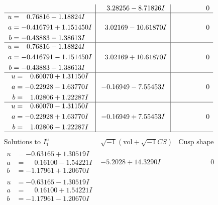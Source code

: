 \documentclass[1p]{elsarticle_modified}
\theoremstyle{definition}
\newcommand{\I}{\sqrt{-1}}
\begin{document}
$$\begin{array}{c|c|c}
 & \phantom{-}3.28256 - 8.71826 I & \phantom{-0.000000 } 0 \\ \hline\begin{aligned}
u &= \phantom{-}0.76816 + 1.18824 I \\
a &= -0.416791 + 1.151450 I \\
b &= -0.43883 - 1.38613 I\end{aligned}
 & \phantom{-}3.02169 - 10.61870 I & \phantom{-0.000000 } 0 \\ \hline\begin{aligned}
u &= \phantom{-}0.76816 - 1.18824 I \\
a &= -0.416791 - 1.151450 I \\
b &= -0.43883 + 1.38613 I\end{aligned}
 & \phantom{-}3.02169 + 10.61870 I & \phantom{-0.000000 } 0 \\ \hline\begin{aligned}
u &= \phantom{-}0.60070 + 1.31150 I \\
a &= -0.22928 - 1.63770 I \\
b &= \phantom{-}1.02806 + 1.22287 I\end{aligned}
 & -0.16949 - 7.55453 I & \phantom{-0.000000 } 0 \\ \hline\begin{aligned}
u &= \phantom{-}0.60070 - 1.31150 I \\
a &= -0.22928 + 1.63770 I \\
b &= \phantom{-}1.02806 - 1.22287 I\end{aligned}
 & -0.16949 + 7.55453 I & \phantom{-0.000000 } 0\\
 \hline 
 \end{array}$$\newpage$$\begin{array}{c|c|c}  
\text{Solutions to }I^u_{1}& \I (\text{vol} + \sqrt{-1}CS) & \text{Cusp shape}\\
 \hline 
\begin{aligned}
u &= -0.63165 + 1.30519 I \\
a &= \phantom{-}0.16100 - 1.54221 I \\
b &= -1.17961 + 1.20670 I\end{aligned}
 & -5.2028 + 14.3290 I & \phantom{-0.000000 } 0 \\ \hline\begin{aligned}
u &= -0.63165 - 1.30519 I \\
a &= \phantom{-}0.16100 + 1.54221 I \\
b &= -1.17961 - 1.20670 I\end{aligned}

\end{array}$$
\end{document}

